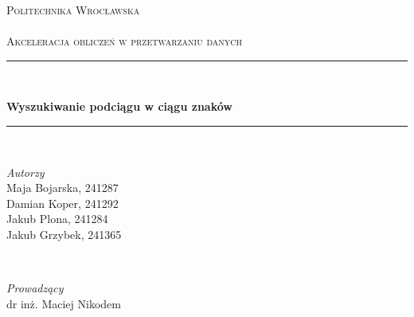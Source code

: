 
\begin{titlepage} %
	\newcommand{\HRule}{\rule{\linewidth}{0.5mm}} %
	
	\center %
	
	
	\textsc{\LARGE Politechnika Wrocławska}\\[1.5cm] %
	
	\textsc{\Large }\\[0.5cm] %
	
	\textsc{\large Akceleracja obliczeń w przetwarzaniu danych}\\[0.5cm] %
	
	
	\HRule\\[0.4cm]
	
	{\Huge\bfseries Wyszukiwanie podciągu w ciągu znaków \par}%
	\vspace{0.4cm}
	\HRule\\[1.5cm]
	
	
	\begin{minipage}{0.4\textwidth}
		\begin{flushleft}
			\large
			\textit{Autorzy}\\
			Maja Bojarska, \textsc{241287} \\ 
			Damian Koper, \textsc{241292} \\
			Jakub Plona, \textsc{241284} \\
			Jakub Grzybek, \textsc{241365} \\
		\end{flushleft}
	\end{minipage}
	~
	\begin{minipage}{0.4\textwidth}
		\begin{flushright}
			\large \textit{Prowadzący}\\
			dr inż. Maciej Nikodem %
		\end{flushright}
	\end{minipage}
	

\end{titlepage}
